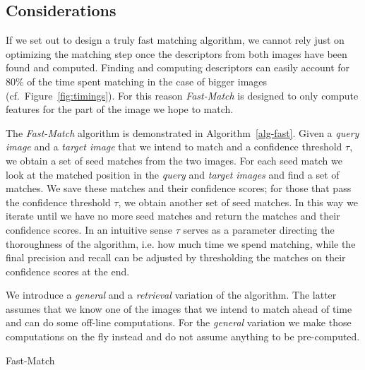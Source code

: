 \documentclass[runningheads]{llncs}
\begin{document}
\subsection{Considerations}
\label{considerations}
%
If we set out to design a truly fast matching algorithm, we cannot rely
just on optimizing the matching step once the descriptors from both
images have been found and computed. Finding and computing descriptors
can easily account for 80\% of the time spent matching in the case of bigger images (cf.\ Figure~\ref{fig:timings}). For this reason \emph{Fast-Match} is designed to only compute features for the part of the image we hope to match. 

The \emph{Fast-Match} algorithm is demonstrated in Algorithm~\ref{alg-fast}. Given a \emph{query image} and a \emph{target image} that we intend to match and a confidence threshold $\tau$, we obtain a set of seed matches from the two images. For each seed match we look at the matched position in the \emph{query} and \emph{target images} and find a set of matches. We save these matches and their confidence scores; for those that pass the confidence threshold $\tau$, we obtain another set of seed matches. In this way we iterate until we have no more seed matches and return the matches and their confidence scores. In an intuitive sense $\tau$ serves as a parameter directing the thoroughness of the algorithm, i.e. how much time we spend matching, while the final precision and recall can be adjusted by thresholding the matches on their confidence scores at the end.

We introduce a \emph{general} and a \emph{retrieval} variation of the algorithm. The latter assumes that we know one of the images that we intend to match ahead of time and can do some off-line computations. For the \emph{general} variation we make those computations on the fly instead and do not assume anything to be pre-computed. 

\begin{algorithm}[htb]
\caption{Fast-Match}
\label{alg-fast}
\end{algorithm}
%
\end{document}
